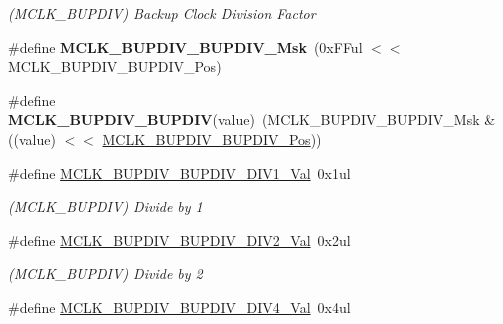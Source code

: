 \begin{DoxyCompactItemize}
\begin{DoxyCompactList}\small\item\em (M\+C\+L\+K\+\_\+\+B\+U\+P\+D\+I\+V) Backup Clock Division Factor \end{DoxyCompactList}\item 
\hypertarget{group___s_a_m_l21___m_c_l_k_gaaf5ec276b248b1db35df2d8d0cd43a63}{}\#define {\bfseries M\+C\+L\+K\+\_\+\+B\+U\+P\+D\+I\+V\+\_\+\+B\+U\+P\+D\+I\+V\+\_\+\+Msk}~(0x\+F\+Ful $<$$<$ M\+C\+L\+K\+\_\+\+B\+U\+P\+D\+I\+V\+\_\+\+B\+U\+P\+D\+I\+V\+\_\+\+Pos)\label{group___s_a_m_l21___m_c_l_k_gaaf5ec276b248b1db35df2d8d0cd43a63}

\item 
\hypertarget{group___s_a_m_l21___m_c_l_k_ga42610a33dd470ab15cbcec8bf88a1bd1}{}\#define {\bfseries M\+C\+L\+K\+\_\+\+B\+U\+P\+D\+I\+V\+\_\+\+B\+U\+P\+D\+I\+V}(value)~(M\+C\+L\+K\+\_\+\+B\+U\+P\+D\+I\+V\+\_\+\+B\+U\+P\+D\+I\+V\+\_\+\+Msk \& ((value) $<$$<$ \hyperlink{group___s_a_m_l21___m_c_l_k_ga990b49fd5adb7bbd8a9acf12cd483ae2}{M\+C\+L\+K\+\_\+\+B\+U\+P\+D\+I\+V\+\_\+\+B\+U\+P\+D\+I\+V\+\_\+\+Pos}))\label{group___s_a_m_l21___m_c_l_k_ga42610a33dd470ab15cbcec8bf88a1bd1}

\item 
\hypertarget{group___s_a_m_l21___m_c_l_k_ga671158df20fbfdcde67f602985780d65}{}\#define \hyperlink{group___s_a_m_l21___m_c_l_k_ga671158df20fbfdcde67f602985780d65}{M\+C\+L\+K\+\_\+\+B\+U\+P\+D\+I\+V\+\_\+\+B\+U\+P\+D\+I\+V\+\_\+\+D\+I\+V1\+\_\+\+Val}~0x1ul\label{group___s_a_m_l21___m_c_l_k_ga671158df20fbfdcde67f602985780d65}

\begin{DoxyCompactList}\small\item\em (M\+C\+L\+K\+\_\+\+B\+U\+P\+D\+I\+V) Divide by 1 \end{DoxyCompactList}\item 
\hypertarget{group___s_a_m_l21___m_c_l_k_gada1d955fec255a2fbcadeba457ae7adc}{}\#define \hyperlink{group___s_a_m_l21___m_c_l_k_gada1d955fec255a2fbcadeba457ae7adc}{M\+C\+L\+K\+\_\+\+B\+U\+P\+D\+I\+V\+\_\+\+B\+U\+P\+D\+I\+V\+\_\+\+D\+I\+V2\+\_\+\+Val}~0x2ul\label{group___s_a_m_l21___m_c_l_k_gada1d955fec255a2fbcadeba457ae7adc}

\begin{DoxyCompactList}\small\item\em (M\+C\+L\+K\+\_\+\+B\+U\+P\+D\+I\+V) Divide by 2 \end{DoxyCompactList}\item 
\hypertarget{group___s_a_m_l21___m_c_l_k_ga8d24e01f4620f7ee40ef3082ae7c0124}{}\#define \hyperlink{group___s_a_m_l21___m_c_l_k_ga8d24e01f4620f7ee40ef3082ae7c0124}{M\+C\+L\+K\+\_\+\+B\+U\+P\+D\+I\+V\+\_\+\+B\+U\+P\+D\+I\+V\+\_\+\+D\+I\+V4\+\_\+\+Val}~0x4ul\label{group___s_a_m_l21___m_c_l_k_ga8d24e01f4620f7ee40ef3082ae7c0124}


\end{DoxyCompactItemize}
